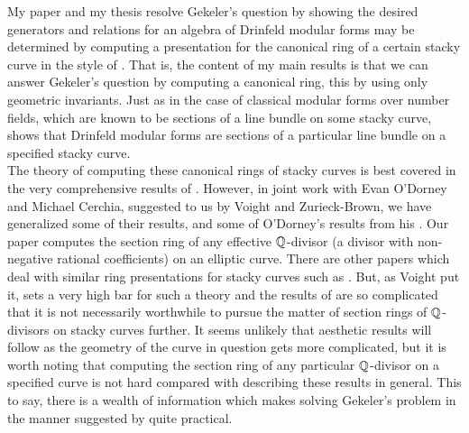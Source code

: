\documentclass[12pt]{amsart}
\begin{document}
	My paper \cite{Franklin-geometry-Drinfeld-modular-forms} and my thesis \cite{Franklin-thesis} resolve Gekeler's question by showing the desired generators and relations for an algebra of Drinfeld modular forms may be determined by computing a presentation for the canonical ring of a certain stacky curve in the style of \cite{VZB}. That is, the content of my main results \cite[Theorems $6.1$ and $6.11$]{Franklin-geometry-Drinfeld-modular-forms} is that we can answer Gekeler's question by computing a canonical ring, this by using only geometric invariants. Just as in the case of classical modular forms over number fields, which are known to be sections of a line bundle on some stacky curve, \cite[Theorem $6.1$]{Franklin-geometry-Drinfeld-modular-forms} shows that Drinfeld modular forms are sections of a particular line bundle on a specified stacky curve.\\
	
	The theory of computing these canonical rings of stacky curves is best covered in the very comprehensive results of \cite{VZB}. However, in joint work with Evan O'Dorney and Michael Cerchia, suggested to us by Voight and Zurieck-Brown, we have generalized some of their results, and some of O'Dorney's results from his \cite{ODorney-canonical-rings-Q-divisors-on-P1}. Our paper \cite{Cerchia-Franklin-ODorney-Qdiv-Ell-curves} computes the section ring of any effective $\mathbb{ Q }$-divisor (a divisor with non-negative rational coefficients) on an elliptic curve. There are other papers which deal with similar ring presentations for stacky curves such as \cite{Landesman-Ruhm-Zhang-Spin-canonical-rings}. But, as Voight put it, \cite{VZB} sets a very high bar for such a theory and the results of \cite{Cerchia-Franklin-ODorney-Qdiv-Ell-curves} are so complicated that it is not necessarily worthwhile to pursue the matter of section rings of $\mathbb{ Q }$-divisors on stacky curves further. It seems unlikely that aesthetic results will follow as the geometry of the curve in question gets more complicated, but it is worth noting that computing the section ring of any particular $\mathbb{ Q }$-divisor on a specified curve is not hard compared with describing these results in general. This to say, there is a wealth of information which makes solving Gekeler's problem in the manner suggested by \cite{Franklin-geometry-Drinfeld-modular-forms} quite practical.\\
	
\end{document}

